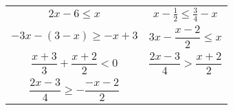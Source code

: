 \documentclass[a4paper,12pt,leqno,fleqn]{article}
\begin{document}
\begin{tabularx}{\linewidth}{@{}XX@{}}

  \begin{equation}
    2x-6\leq x
  \end{equation}
&
  \begin{equation}
    x-\tfrac{1}{2}\leq\tfrac{3}{4}-x
  \end{equation}
\\
  \begin{equation}
    -3x-(3-x)\geq-x+3
  \end{equation}
&
  \begin{equation}
    3x-\frac{x-2}{2}\leq x
  \end{equation}
\\
  \begin{equation}
    \frac{x+3}{3}+\frac{x+2}{2}<0
  \end{equation}
&
  \begin{equation}
    \frac{2x-3}{4}>\frac{x+2}{2}
  \end{equation}
\\
  \begin{equation}
    \frac{2x-3}{4}\geq-\frac{-x-2}{2}
  \end{equation}








\end{tabularx}
\end{document}
